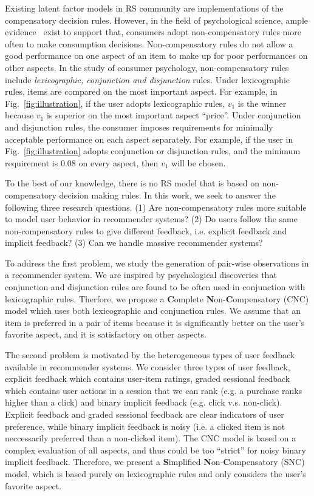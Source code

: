 \documentclass[conference]{IEEEtran}
\begin{document}
% 
Existing latent factor models in RS community are implementations of the compensatory decision rules. However, in the field of psychological science, ample evidence~\cite{Engel1986Consumer} exist to support that, consumers adopt non-compensatory rules more often to make consumption decisions. Non-compensatory rules do not allow a good performance on one aspect of an item to make up for poor performances on other aspects. In the study of consumer psychology, non-compensatory rules include \emph{lexicographic, conjunction and disjunction} rules. Under lexicographic rules, items are compared on the most important aspect. For example, in Fig.~\ref{fig:illustration}, if the user adopts lexicographic rules, $v_1$ is the winner because $v_1$ is superior on the most important aspect ``price''.  Under conjunction and disjunction rules, the consumer imposes requirements for minimally acceptable performance on each aspect separately. For example, if the user in Fig.~\ref{fig:illustration} adopts conjunction or disjunction rules, and the minimum requirement is $0.08$ on every aspect, then $v_1$ will be chosen. 


To the best of our knowledge, there is no RS model that is based on non-compensatory decision making rules. In this work, we seek to answer the following three research questions. (1) Are non-compensatory rules more suitable to model user behavior in recommender systems? (2) Do users follow the same non-compensatory rules to give different feedback, i.e. explicit feedback and implicit feedback? (3) Can we handle massive recommender systems?
  
To address the first problem, we study the generation of pair-wise observations in a recommender system. We are inspired by psychological discoveries that conjunction and disjunction rules are found to be often used in conjunction with lexicographic rules. Therfore, we propose a \textbf{C}omplete \textbf{N}on-\textbf{C}ompensatory (CNC) model which uses both lexicographic and conjunction rules. We assume that an item is preferred in a pair of items because it is significantly better on the user's favorite aspect, and it is satisfactory on other aspects.     
  
The second problem is motivated by the heterogeneous types of user feedback available in recommender systems. We consider three types of user feedback, explicit feedback which contains user-item ratings, graded sessional feedback which contains user actions in a session that we can rank (e.g. a purchase ranks higher than a click) and binary implicit feedback (e.g. click v.s. non-click). Explicit feedback and graded sessional feedback are clear indicators of user preference, while binary implicit feedback is noisy (i.e. a clicked item is not neccessarily preferred than a non-clicked item). The CNC model is based on a complex evaluation of all aspects, and thus could be too ``strict'' for noisy binary implicit feedback. Therefore, we present a \textbf{S}implified \textbf{N}on-\textbf{C}ompensatory (SNC) model, which is based purely on lexicographic rules and only considers the user's favorite aspect.  
\end{document}
